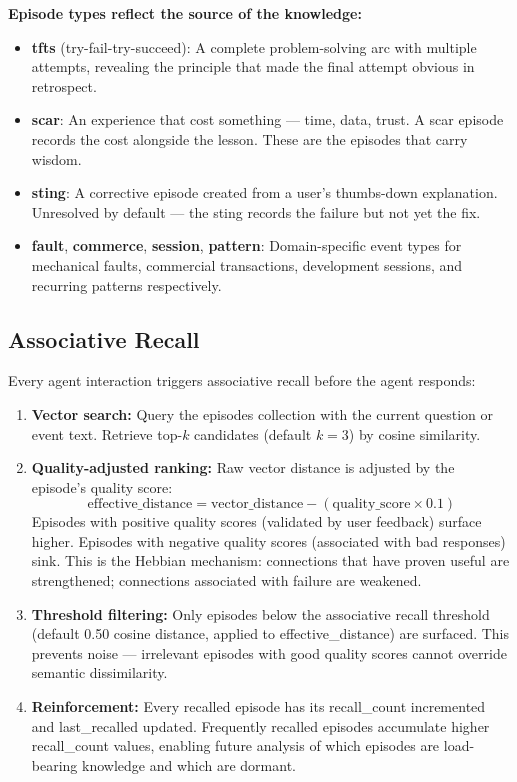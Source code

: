 \documentclass[11pt,a4paper]{article}
\begin{document}
\textbf{Episode types reflect the source of the knowledge:}
\begin{itemize}
    \item \textbf{tfts} (try-fail-try-succeed): A complete problem-solving arc with multiple attempts, revealing the principle that made the final attempt obvious in retrospect.
    \item \textbf{scar}: An experience that cost something --- time, data, trust. A scar episode records the cost alongside the lesson. These are the episodes that carry wisdom.
    \item \textbf{sting}: A corrective episode created from a user's thumbs-down explanation. Unresolved by default --- the sting records the failure but not yet the fix.
    \item \textbf{fault}, \textbf{commerce}, \textbf{session}, \textbf{pattern}: Domain-specific event types for mechanical faults, commercial transactions, development sessions, and recurring patterns respectively.
\end{itemize}

\subsection{Associative Recall}

Every agent interaction triggers associative recall before the agent responds:

\begin{enumerate}
    \item \textbf{Vector search:} Query the episodes collection with the current question or event text. Retrieve top-$k$ candidates (default $k=3$) by cosine similarity.

    \item \textbf{Quality-adjusted ranking:} Raw vector distance is adjusted by the episode's quality score:
    \begin{equation}
        \text{effective\_distance} = \text{vector\_distance} - (\text{quality\_score} \times 0.1)
    \end{equation}
    Episodes with positive quality scores (validated by user feedback) surface higher. Episodes with negative quality scores (associated with bad responses) sink. This is the Hebbian mechanism: connections that have proven useful are strengthened; connections associated with failure are weakened.

    \item \textbf{Threshold filtering:} Only episodes below the associative recall threshold (default 0.50 cosine distance, applied to effective\_distance) are surfaced. This prevents noise --- irrelevant episodes with good quality scores cannot override semantic dissimilarity.

    \item \textbf{Reinforcement:} Every recalled episode has its recall\_count incremented and last\_recalled updated. Frequently recalled episodes accumulate higher recall\_count values, enabling future analysis of which episodes are load-bearing knowledge and which are dormant.
\end{enumerate}
\end{document}
